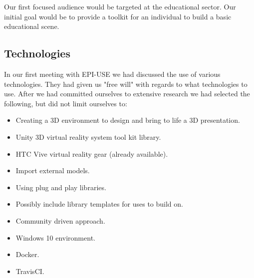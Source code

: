 	Our first focused audience would be targeted at the educational sector. Our initial goal would be to provide a toolkit for an individual to build a basic educational scene.

\subsection{Technologies}
	In our first meeting with EPI-USE we had discussed the use of various technologies. They had given us "free will" with regards to what technologies to use. After we had committed ourselves to extensive research we had selected the following, but did not limit ourselves to:
	\begin{itemize}		
		\item Creating a 3D environment to design and bring to life a 3D presentation.		
		\item Unity 3D virtual reality system tool kit library.
		\item HTC Vive virtual reality gear (already available).
		\item Import external models.
		\item Using plug and play libraries.
		\item Possibly include library templates for uses to build on.
		\item Community driven approach.
		\item Windows 10 environment.
		\item Docker.
		\item TravisCI.
	\end{itemize}

